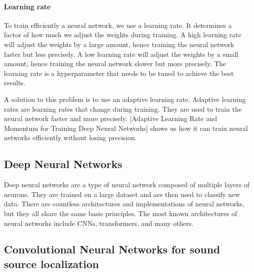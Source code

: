 \paragraph{Learning rate}

To train efficiently a neural network, we use a learning rate. It determines a factor of how much we adjust the weights during training. A high learning rate will adjust the weights by a large amount, hence training the neural network faster but less precisely. A low learning rate will adjust the weights by a small amount, hence training the neural network slower but more precisely. The learning rate is a hyperparameter that needs to be tuned to achieve the best results.

A solution to this problem is to use an adaptive learning rate. Adaptive learning rates are learning rates that change during training. They are used to train the neural network faster and more precisely. [Adaptive Learning Rate and Momentum for Training Deep Neural Networks]\cite{hao2021adaptive} shows us how it can train neural networks efficiently without losing precision. 

\subsection{Deep Neural Networks}

Deep neural networks are a type of neural network composed of multiple layers of neurons\cite{Schmidhuber_2015}. They are trained on a large dataset and are then used to classify new data. There are countless architectures \cite{LIU201711} and implementations of neural networks, but they all share the same basic principles. The most known architectures of neural networks include CNNs\cite{oshea2015introduction}, transformers\cite{vaswani2017attention}, and many others.

\subsection{Convolutional Neural Networks for sound source localization}
\label{sec:cnn_for_ssl}

